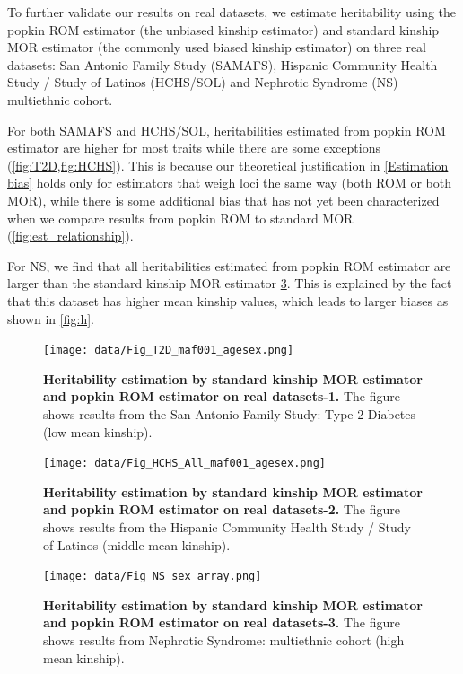 \documentclass[11pt]{article}
\begin{document}
To further validate our results on real datasets, we estimate heritability using the popkin ROM estimator (the unbiased kinship estimator) and standard kinship MOR estimator (the commonly used biased kinship estimator) on three real datasets: San Antonio Family Study (SAMAFS), Hispanic Community Health Study / Study of Latinos (HCHS/SOL) and  Nephrotic Syndrome (NS) multiethnic cohort.

For both SAMAFS and HCHS/SOL, heritabilities estimated from popkin ROM estimator are higher for most traits while there are some exceptions (\cref{fig:T2D,fig:HCHS}). This is because our theoretical justification in \ref{Estimation bias} holds only for estimators that weigh loci the same way (both ROM or both MOR), while there is some additional bias that has not yet been characterized when we compare results from popkin ROM to standard MOR (\cref{fig:est_relationship}).

For NS, we find that all heritabilities estimated from popkin ROM estimator are larger than the standard kinship MOR estimator \cref{fig:NS}. This is explained by the fact that this dataset has higher mean kinship values, which leads to larger biases as shown in \cref{fig:h}.


\begin{figure}[bp!]
  \centering
  \texttt{[image: data/Fig\_T2D\_maf001\_agesex.png]}
  \caption{
    {\bf Heritability estimation by standard kinship MOR estimator and popkin ROM estimator on real datasets-1.}
    The figure shows results from the San Antonio Family Study: Type 2 Diabetes (low mean kinship).
    }
  \label{fig:T2D}
\end{figure}

\begin{figure}[bp!]
  \centering
  \texttt{[image: data/Fig\_HCHS\_All\_maf001\_agesex.png]}
  \caption{
    {\bf Heritability estimation by standard kinship MOR estimator and popkin ROM estimator on real datasets-2.}
    The figure shows results from the Hispanic Community Health Study / Study of Latinos (middle mean kinship).
    }
  \label{fig:HCHS}
\end{figure}

\begin{figure}[bp!]
  \centering
  \texttt{[image: data/Fig\_NS\_sex\_array.png]}
  \caption{
    {\bf Heritability estimation by standard kinship MOR estimator and popkin ROM estimator on real datasets-3.}
    The figure shows results from Nephrotic Syndrome: multiethnic cohort (high mean kinship).
    }
  \label{fig:NS}
\end{figure}
\end{document}
